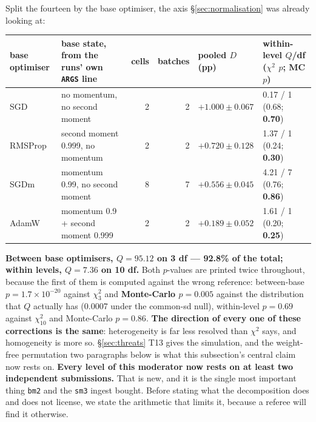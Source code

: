 \documentclass[10pt,letterpaper]{article}
\newcommand{\Dstat}{D}                         %
\newcommand{\arm}[1]{\texttt{#1}}
\begin{document}
Split the fourteen by the base optimiser, the axis \S\ref{sec:normalisation} was already looking
at:

\begin{center}
\footnotesize
\setlength{\tabcolsep}{4pt}
\begin{tabular}{@{}llrrll@{}}
\toprule
base optimiser & base state, from the runs' own \texttt{ARGS} line & cells & batches &
  pooled $\Dstat$ (pp) & within-level $Q$/df ($\chi^2$ $p$; MC $p$) \\
\midrule
SGD     & no momentum, no second moment & 2 & 2 & $\mathbf{+1.000 \pm 0.067}$ & 0.17 / 1 (0.68; \textbf{0.70}) \\
RMSProp & second moment 0.999, no momentum & 2 & 2 & $\mathbf{+0.720 \pm 0.128}$ & 1.37 / 1 (0.24; \textbf{0.30}) \\
SGDm    & momentum 0.99, no second moment & 8 & 7 & $\mathbf{+0.556 \pm 0.045}$ & 4.21 / 7 (0.76; \textbf{0.86}) \\
AdamW   & momentum 0.9 + second moment 0.999 & 2 & 2 & $\mathbf{+0.189 \pm 0.052}$ & 1.61 / 1 (0.20; \textbf{0.25}) \\
\bottomrule
\end{tabular}
\end{center}

\textbf{Between base optimisers, $Q = 95.12$ on 3 df --- 92.8\% of the total; within levels,
$Q = 7.36$ on 10 df.} Both $p$-values are printed twice throughout, because the first of them is
computed against the wrong reference: between-base $p = 1.7\times10^{-20}$ against $\chi^2_3$
and \textbf{Monte-Carlo $p = 0.005$} against the distribution that $Q$ actually has (0.0007 under
the common-sd null), within-level $p = 0.69$ against $\chi^2_{10}$ and Monte-Carlo $p = 0.86$.
\textbf{The direction of every one of these corrections is the same}: heterogeneity is far less
resolved than $\chi^2$ says, and homogeneity is more so. \S\ref{sec:threats} T13 gives the
simulation, and the weight-free permutation two paragraphs below is what this subsection's
central claim now rests on. \textbf{Every level of this moderator
now rests on at least two independent submissions.} That is new, and it is the single most
important thing \arm{bm2} and the \arm{sm3} ingest bought. Before stating what the decomposition
does and does not license, we state the arithmetic that limits it, because a referee will find it
otherwise.
\end{document}
